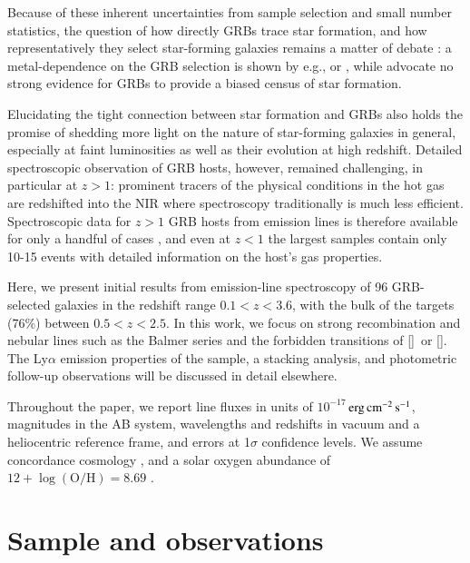 \documentclass[traditabstract, longauth]{aa}
\newcommand{\erg}{$\rm{erg\,cm^{-2}\,s^{-1}}$}
\newcommand{\oh}{12+\log(\mathrm{O/H})}
\newcommand{\oii}{[\ion{O}{ii}]}
\newcommand{\oiii}{[\ion{O}{iii}]}
\begin{document}
Because of these inherent uncertainties from sample selection and small number statistics, the question of how directly GRBs trace star formation, and how representatively they select star-forming galaxies remains a matter of debate \citep[e.g.,][]{2012ApJ...755...85M, 2014arXiv1409.7064V, 2015arXiv150304246S}: a metal-dependence on the GRB selection is shown by e.g., \citet{2013ApJ...774..119G} or \citet{2013ApJ...778..128P}, while \citet{2014A&A...565A.112H} advocate no strong evidence for GRBs to provide a biased census of star formation.
 
Elucidating the tight connection between star formation and GRBs also holds the promise of shedding more light on the nature of star-forming galaxies in general, especially at faint luminosities as well as their evolution at high redshift. Detailed spectroscopic observation of GRB hosts, however, remained challenging, in particular at $z>1$: prominent tracers of the physical conditions in the hot gas are redshifted into the NIR where spectroscopy traditionally is much less efficient. Spectroscopic data for $z > 1$ GRB hosts from emission lines is therefore available for only a handful of cases \citep[e.g.,][]{2012MNRAS.419.3039C, 2014arXiv1409.6315F, 2015Silviasubm}, and even at $z < 1$ the largest samples \citep{2009ApJ...691..182S, 2010AJ....139..694L, 2013ApJ...774..119G} contain only 10-15 events with detailed information on the host's gas properties.

Here, we present initial results from emission-line spectroscopy of 96 GRB-selected galaxies in the redshift range $0.1<z<3.6$, with the bulk of the targets (76\%) between $0.5<z<2.5$. In this work, we focus on strong recombination and nebular lines such as the Balmer series and the forbidden transitions of \oii\, or \oiii. The Ly$\alpha$ emission properties of the sample, a stacking analysis, and photometric follow-up observations will be discussed in detail elsewhere. 

Throughout the paper, we report line fluxes in units of $10^{-17}\,$\erg, magnitudes in the AB system, wavelengths and redshifts in vacuum and a heliocentric reference frame, and errors at 1$\sigma$ confidence levels. We assume concordance cosmology \citep[][$\Omega_{\rm{m}}=0.315$, $\Omega_\Lambda=0.685$, $H_0=67.3\,\rm{km}\,s^{-1}\, Mpc^{-1}$]{2014A&A...571A..16P}, and a solar oxygen abundance of $\oh=8.69$ \citep{2009ARA&A..47..481A}.

\section{Sample and observations}

\end{document}
